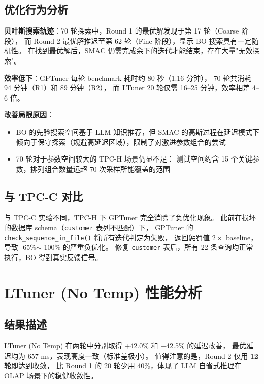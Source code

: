 \subsection{优化行为分析}

\textbf{贝叶斯搜索轨迹}：70 轮探索中，Round 1 的最优解发现于第 17 轮（Coarse 阶段），
而 Round 2 最优解推迟至第 62 轮（Fine 阶段），显示 BO 搜索具有一定随机性。
在找到最优解后，SMAC 仍需完成余下的迭代才能结束，存在大量"无效探索"。

\textbf{效率低下}：GPTuner 每轮 benchmark 耗时约 80 秒（1.16 分钟），
70 轮共消耗 94 分钟（R1）和 89 分钟（R2），
而 LTuner 20 轮仅需 16--25 分钟，效率相差 4--6 倍。

\textbf{改善局限原因}：
\begin{itemize}
  \item BO 的先验搜索空间基于 LLM 知识推荐，但 SMAC 的高斯过程在延迟模式下
        倾向于保守探索（规避高延迟区域），限制了对激进参数组合的尝试
  \item 70 轮对于参数空间较大的 TPC-H 场景仍显不足：
        测试空间约含 15 个关键参数，排列组合数量远超 70 次采样所能覆盖的范围
\end{itemize}

\subsection{与 TPC-C 对比}

与 TPC-C 实验不同，TPC-H 下 GPTuner 完全消除了负优化现象。
此前在损坏的数据库 schema（\texttt{customer} 表列不匹配）下，
GPTuner 的 \texttt{check\_sequence\_in\_file()} 将所有迭代判定为失败，
返回惩罚值 $2 \times$ baseline，导致 -65\%$\sim$-100\% 的严重负优化。
修复 \texttt{customer} 表后，所有 22 条查询均正常执行，BO 得到真实反馈信号。



\section{LTuner (No Temp) 性能分析}

\subsection{结果描述}

LTuner (No Temp) 在两轮中分别取得 +42.0\% 和 +42.5\% 的延迟改善，
最优延迟均为 657 ms，表现高度一致（标准差极小）。
值得注意的是，Round 2 仅用 \textbf{12 轮}即达到收敛，
比 Round 1 的 20 轮少用 40\%，体现了 LLM 自省式推理在 OLAP 场景下的稳健收敛性。

